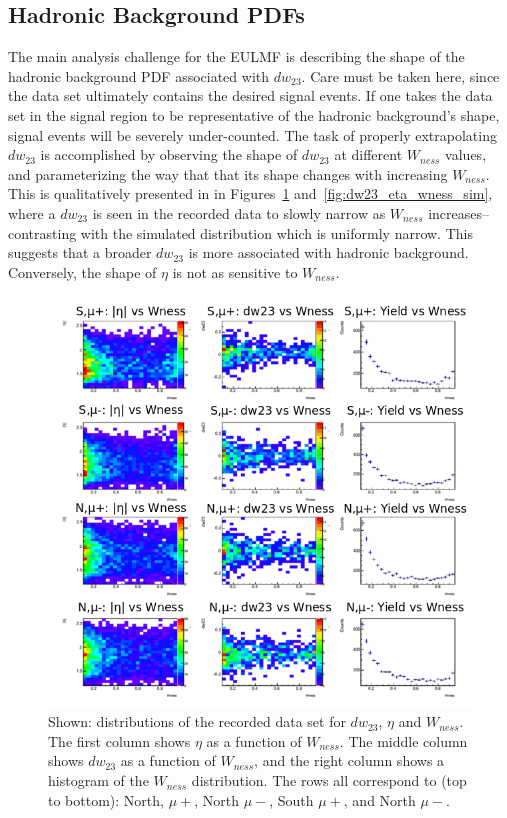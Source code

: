 \subsection{Hadronic Background PDFs}
\label{sec:hadronic_background_pdfs}
The main analysis challenge for the EULMF is describing the shape of the
hadronic background PDF associated with $dw_{23}$. Care must be taken here,
since the data set ultimately contains the desired signal events. If one takes
the data set in the signal region to be representative of the hadronic
background's shape, signal events will be severely under-counted. The task of
properly extrapolating $dw_{23}$ is accomplished by observing the shape of
$dw_{23}$ at different $W_{ness}$ values, and parameterizing the way that that
its shape changes with increasing $W_{ness}$. This is qualitatively presented in
in Figures~\ref{fig:dw23_eta_wness_dat} and~\ref{fig:dw23_eta_wness_sim}, where
a $dw_{23}$ is seen in the recorded data to slowly narrow as $W_{ness}$
increases--contrasting with the simulated distribution which is uniformly
narrow. This suggests that a broader $dw_{23}$ is more associated with hadronic
background. Conversely, the shape of $\eta$ is not as sensitive to $W_{ness}$.

\begin{figure}[ht]
  \centering
  \includegraphics[width=\linewidth]{./figures/dw23_vs_wness_data.png}
  \caption{
    Shown: distributions of the recorded data set for $dw_{23}$, $\eta$ and
    $W_{ness}$.  The first column shows $\eta$ as a function of $W_{ness}$. The
    middle column shows $dw_{23}$ as a function of $W_{ness}$, and the right
    column shows a histogram of the $W_{ness}$ distribution. The rows all
    correspond to (top to bottom): North, $\mu+$, North $\mu-$, South $\mu+$,
    and North $\mu-$.
  }
  \label{fig:dw23_eta_wness_dat}
\end{figure}

